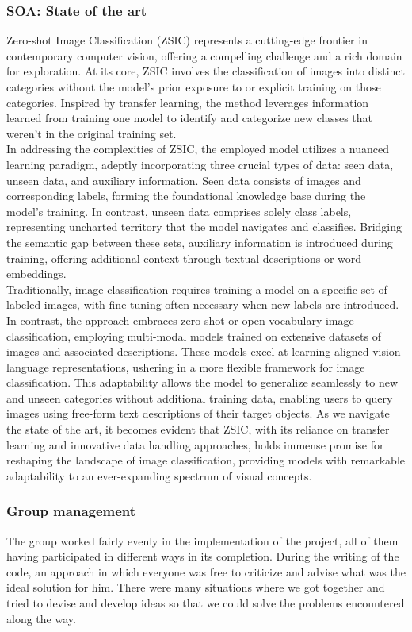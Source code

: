 \documentclass[12pt,a4paper,twoside]{article}
\begin{document}
\subsubsection{SOA: State of the art}
Zero-shot Image Classification (ZSIC) represents a cutting-edge frontier in contemporary computer vision, offering a compelling challenge and a rich domain for exploration. At its core, ZSIC involves the classification of images into distinct categories without the model's prior exposure to or explicit training on those categories. Inspired by transfer learning, the method leverages information learned from training one model to identify and categorize new classes that weren't in the original training set. \\
In addressing the complexities of ZSIC, the employed model utilizes a nuanced learning paradigm, adeptly incorporating three crucial types of data: seen data, unseen data, and auxiliary information. Seen data consists of images and corresponding labels, forming the foundational knowledge base during the model's training. In contrast, unseen data comprises solely class labels, representing uncharted territory that the model navigates and classifies. Bridging the semantic gap between these sets, auxiliary information is introduced during training, offering additional context through textual descriptions or word embeddings.\\ 
Traditionally, image classification requires training a model on a specific set of labeled images, with fine-tuning often necessary when new labels are introduced. In contrast, the approach embraces zero-shot or open vocabulary image classification, employing multi-modal models trained on extensive datasets of images and associated descriptions. These models excel at learning aligned vision-language representations, ushering in a more flexible framework for image classification. This adaptability allows the model to generalize seamlessly to new and unseen categories without additional training data, enabling users to query images using free-form text descriptions of their target objects. As we navigate the state of the art, it becomes evident that ZSIC, with its reliance on transfer learning and innovative data handling approaches, holds immense promise for reshaping the landscape of image classification, providing models with remarkable adaptability to an ever-expanding spectrum of visual concepts.

\subsubsection{Group management}
The group worked fairly evenly in the implementation of the project, all of them having 
participated in different ways in its completion. During the writing of the code, an approach in which everyone was free to criticize and advise what was the ideal solution for him. There were many situations where we got together and tried to devise and develop ideas so that we could 
solve the problems encountered along the way.
\end{document}
